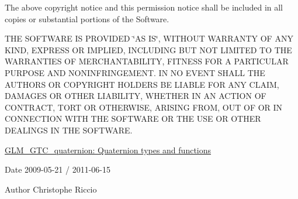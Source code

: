 \-The above copyright notice and this permission notice shall be included in all copies or substantial portions of the \-Software.

\-T\-H\-E \-S\-O\-F\-T\-W\-A\-R\-E \-I\-S \-P\-R\-O\-V\-I\-D\-E\-D \char`\"{}\-A\-S I\-S\char`\"{}, \-W\-I\-T\-H\-O\-U\-T \-W\-A\-R\-R\-A\-N\-T\-Y \-O\-F \-A\-N\-Y \-K\-I\-N\-D, \-E\-X\-P\-R\-E\-S\-S \-O\-R \-I\-M\-P\-L\-I\-E\-D, \-I\-N\-C\-L\-U\-D\-I\-N\-G \-B\-U\-T \-N\-O\-T \-L\-I\-M\-I\-T\-E\-D \-T\-O \-T\-H\-E \-W\-A\-R\-R\-A\-N\-T\-I\-E\-S \-O\-F \-M\-E\-R\-C\-H\-A\-N\-T\-A\-B\-I\-L\-I\-T\-Y, \-F\-I\-T\-N\-E\-S\-S \-F\-O\-R \-A \-P\-A\-R\-T\-I\-C\-U\-L\-A\-R \-P\-U\-R\-P\-O\-S\-E \-A\-N\-D \-N\-O\-N\-I\-N\-F\-R\-I\-N\-G\-E\-M\-E\-N\-T. \-I\-N \-N\-O \-E\-V\-E\-N\-T \-S\-H\-A\-L\-L \-T\-H\-E \-A\-U\-T\-H\-O\-R\-S \-O\-R \-C\-O\-P\-Y\-R\-I\-G\-H\-T \-H\-O\-L\-D\-E\-R\-S \-B\-E \-L\-I\-A\-B\-L\-E \-F\-O\-R \-A\-N\-Y \-C\-L\-A\-I\-M, \-D\-A\-M\-A\-G\-E\-S \-O\-R \-O\-T\-H\-E\-R \-L\-I\-A\-B\-I\-L\-I\-T\-Y, \-W\-H\-E\-T\-H\-E\-R \-I\-N \-A\-N \-A\-C\-T\-I\-O\-N \-O\-F \-C\-O\-N\-T\-R\-A\-C\-T, \-T\-O\-R\-T \-O\-R \-O\-T\-H\-E\-R\-W\-I\-S\-E, \-A\-R\-I\-S\-I\-N\-G \-F\-R\-O\-M, \-O\-U\-T \-O\-F \-O\-R \-I\-N \-C\-O\-N\-N\-E\-C\-T\-I\-O\-N \-W\-I\-T\-H \-T\-H\-E \-S\-O\-F\-T\-W\-A\-R\-E \-O\-R \-T\-H\-E \-U\-S\-E \-O\-R \-O\-T\-H\-E\-R \-D\-E\-A\-L\-I\-N\-G\-S \-I\-N \-T\-H\-E \-S\-O\-F\-T\-W\-A\-R\-E.

\hyperlink{group__gtc__quaternion}{\-G\-L\-M\-\_\-\-G\-T\-C\-\_\-quaternion\-: \-Quaternion types and functions}

\begin{DoxyDate}{\-Date}
2009-\/05-\/21 / 2011-\/06-\/15 
\end{DoxyDate}
\begin{DoxyAuthor}{\-Author}
\-Christophe \-Riccio 
\end{DoxyAuthor}
